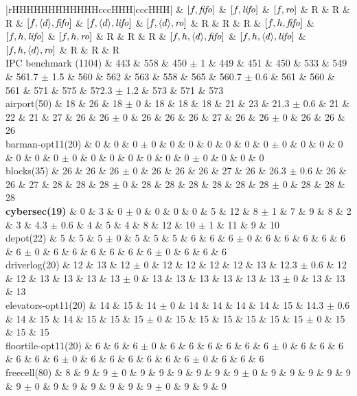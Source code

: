 \begin{center}
\begin{tabular}{|rHHHHHHHHHHHHcccHHH|cccHHH|}
\hline
 & \([f,{\text{\textit{fifo}}}]\) & \([f,{\text{\textit{lifo}}}]\) & \([f,{\text{\textit{ro}}}]\) & R & R & R & \([f,{\left<d\right>},{\text{\textit{fifo}}}]\) & \([f,{\left<d\right>},{\text{\textit{lifo}}}]\) & \([f,{\left<d\right>},{\text{\textit{ro}}}]\) & R & R & R & \([f,h,{\text{\textit{fifo}}}]\) & \([f,h,{\text{\textit{lifo}}}]\) & \([f,h,{\text{\textit{ro}}}]\) & R & R & R & \([f,h,{\left<d\right>},{\text{\textit{fifo}}}]\) & \([f,h,{\left<d\right>},{\text{\textit{lifo}}}]\) & \([f,h,{\left<d\right>},{\text{\textit{ro}}}]\) & R & R & R\\
\hline
IPC benchmark (1104) & 443 & 558 & 450 \(\pm\) 1 & 449 & 451 & 450 & 533 & 549 & 561.7 \(\pm\) 1.5 & 560 & 562 & 563 & 558 & 565 & 560.7 \(\pm\) 0.6 & 561 & 560 & 561 & 571 & 575 & 572.3 \(\pm\) 1.2 & 573 & 571 & 573\\
\hline
airport(50) & 18 & 26 & 18 \(\pm\) 0 & 18 & 18 & 18 & 21 & 23 & 21.3 \(\pm\) 0.6 & 21 & 22 & 21 & 27 & 26 & 26 \(\pm\) 0 & 26 & 26 & 26 & 27 & 26 & 26 \(\pm\) 0 & 26 & 26 & 26\\
barman-opt11(20) & 0 & 0 & 0 \(\pm\) 0 & 0 & 0 & 0 & 0 & 0 & 0 \(\pm\) 0 & 0 & 0 & 0 & 0 & 0 & 0 \(\pm\) 0 & 0 & 0 & 0 & 0 & 0 & 0 \(\pm\) 0 & 0 & 0 & 0\\
blocks(35) & 26 & 26 & 26 \(\pm\) 0 & 26 & 26 & 26 & 27 & 26 & 26.3 \(\pm\) 0.6 & 26 & 26 & 27 & 28 & 28 & 28 \(\pm\) 0 & 28 & 28 & 28 & 28 & 28 & 28 \(\pm\) 0 & 28 & 28 & 28\\
\textbf{cybersec(19)} & 0 & 3 & 0 \(\pm\) 0 & 0 & 0 & 0 & 5 & 12 & 8 \(\pm\) 1 & 7 & 9 & 8 & 2 & 3 & 4.3 \(\pm\) 0.6 & 4 & 5 & 4 & 8 & 12 & 10 \(\pm\) 1 & 11 & 9 & 10\\
depot(22) & 5 & 5 & 5 \(\pm\) 0 & 5 & 5 & 5 & 6 & 6 & 6 \(\pm\) 0 & 6 & 6 & 6 & 6 & 6 & 6 \(\pm\) 0 & 6 & 6 & 6 & 6 & 6 & 6 \(\pm\) 0 & 6 & 6 & 6\\
driverlog(20) & 12 & 13 & 12 \(\pm\) 0 & 12 & 12 & 12 & 12 & 13 & 12.3 \(\pm\) 0.6 & 12 & 12 & 13 & 13 & 13 & 13 \(\pm\) 0 & 13 & 13 & 13 & 13 & 13 & 13 \(\pm\) 0 & 13 & 13 & 13\\
elevators-opt11(20) & 14 & 15 & 14 \(\pm\) 0 & 14 & 14 & 14 & 14 & 15 & 14.3 \(\pm\) 0.6 & 14 & 15 & 14 & 15 & 15 & 15 \(\pm\) 0 & 15 & 15 & 15 & 15 & 15 & 15 \(\pm\) 0 & 15 & 15 & 15\\
floortile-opt11(20) & 6 & 6 & 6 \(\pm\) 0 & 6 & 6 & 6 & 6 & 6 & 6 \(\pm\) 0 & 6 & 6 & 6 & 6 & 6 & 6 \(\pm\) 0 & 6 & 6 & 6 & 6 & 6 & 6 \(\pm\) 0 & 6 & 6 & 6\\
freecell(80) & 8 & 9 & 9 \(\pm\) 0 & 9 & 9 & 9 & 9 & 9 & 9 \(\pm\) 0 & 9 & 9 & 9 & 9 & 9 & 9 \(\pm\) 0 & 9 & 9 & 9 & 9 & 9 & 9 \(\pm\) 0 & 9 & 9 & 9\\

\end{tabular}
\end{center}
